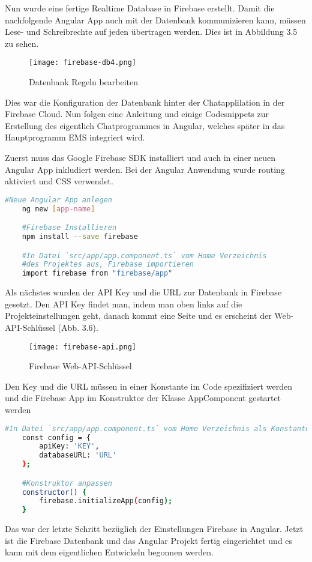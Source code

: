 Nun wurde eine fertige Realtime Database in Firebase erstellt. Damit die nachfolgende Angular App auch mit der Datenbank kommunizieren kann, müssen Lese- und Schreibrechte auf
jeden übertragen werden. Dies ist in Abbildung 3.5 zu sehen.
\begin{center}
    \begin{figure}[H]
        \centering
        \texttt{[image: firebase-db4.png]}
        \caption{Datenbank Regeln bearbeiten}
    \end{figure}
\end{center}
Dies war die Konfiguration der Datenbank hinter der Chatapplilation in der Firebase Cloud. Nun folgen eine Anleitung und einige Codesnippets zur Erstellung des eigentlich Chatprogrammes in Angular, welches später in das Hauptprogramm
EMS integriert wird.

Zuerst muss das Google Firebase SDK installiert und auch in einer neuen Angular App inkludiert werden. Bei der Angular Anwendung wurde routing aktiviert und CSS verwendet.
\begin{lstlisting}[language=bash]
    #Neue Angular App anlegen
    ng new [app-name]

    #Firebase Installieren
    npm install --save firebase

    #In Datei `src/app/app.component.ts` vom Home Verzeichnis 
    #des Projektes aus, Firebase importieren
    import firebase from "firebase/app"
\end{lstlisting}

Als nächstes wurden der API Key und die URL zur Datenbank in Firebase gesetzt. Den API Key findet man, indem man oben links auf die Projekteinstellungen geht, danach kommt eine Seite und es erscheint der Web-API-Schlüssel (Abb. 3.6).
\begin{center}
    \begin{figure}[H]
        \centering
        \texttt{[image: firebase-api.png]}
        \caption{Firebase Web-API-Schlüssel}
    \end{figure}
\end{center}
Den Key und die URL müssen in einer Konstante im Code spezifiziert werden und die Firebase App im Konstruktor der Klasse AppComponent gestartet werden
\begin{lstlisting}[language=bash]
    #In Datei `src/app/app.component.ts` vom Home Verzeichnis als Konstante zu definieren
    const config = {
        apiKey: 'KEY',
        databaseURL: 'URL'
    };

    #Konstruktor anpassen
    constructor() {
        firebase.initializeApp(config);
    }
\end{lstlisting}
Das war der letzte Schritt bezüglich der Einstellungen Firebase in Angular. Jetzt ist die Firebase Datenbank und das Angular Projekt fertig eingerichtet und es kann mit dem eigentlichen Entwickeln begonnen werden.

